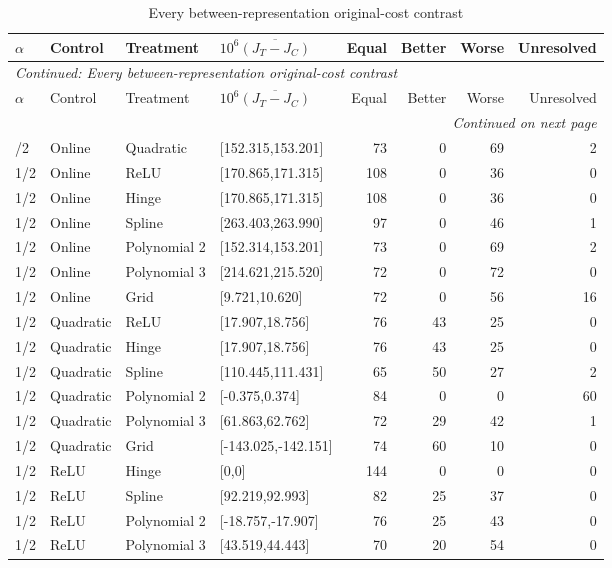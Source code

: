 \begingroup\footnotesize\setlength{\tabcolsep}{3pt}
\begin{longtable}{llllrrrr}
\caption{Every between-representation original-cost contrast}\label{tab:crossarm119c}\\
\toprule
$\alpha$ & Control & Treatment & $10^6\overline{(J_T-J_C)}$ & Equal & Better & Worse & Unresolved\\\midrule
\endfirsthead
\multicolumn{8}{l}{\textit{Continued: Every between-representation original-cost contrast}}\\
\toprule
$\alpha$ & Control & Treatment & $10^6\overline{(J_T-J_C)}$ & Equal & Better & Worse & Unresolved\\\midrule
\endhead
\midrule\multicolumn{8}{r}{\textit{Continued on next page}}\\
\endfoot
\bottomrule
\endlastfoot
1/2 & Online & Quadratic & [152.315,153.201] & 73 & 0 & 69 & 2 \\
1/2 & Online & ReLU & [170.865,171.315] & 108 & 0 & 36 & 0 \\
1/2 & Online & Hinge & [170.865,171.315] & 108 & 0 & 36 & 0 \\
1/2 & Online & Spline & [263.403,263.990] & 97 & 0 & 46 & 1 \\
1/2 & Online & Polynomial 2 & [152.314,153.201] & 73 & 0 & 69 & 2 \\
1/2 & Online & Polynomial 3 & [214.621,215.520] & 72 & 0 & 72 & 0 \\
1/2 & Online & Grid & [9.721,10.620] & 72 & 0 & 56 & 16 \\
1/2 & Quadratic & ReLU & [17.907,18.756] & 76 & 43 & 25 & 0 \\
1/2 & Quadratic & Hinge & [17.907,18.756] & 76 & 43 & 25 & 0 \\
1/2 & Quadratic & Spline & [110.445,111.431] & 65 & 50 & 27 & 2 \\
1/2 & Quadratic & Polynomial 2 & [-0.375,0.374] & 84 & 0 & 0 & 60 \\
1/2 & Quadratic & Polynomial 3 & [61.863,62.762] & 72 & 29 & 42 & 1 \\
1/2 & Quadratic & Grid & [-143.025,-142.151] & 74 & 60 & 10 & 0 \\
1/2 & ReLU & Hinge & [0,0] & 144 & 0 & 0 & 0 \\
1/2 & ReLU & Spline & [92.219,92.993] & 82 & 25 & 37 & 0 \\
1/2 & ReLU & Polynomial 2 & [-18.757,-17.907] & 76 & 25 & 43 & 0 \\
1/2 & ReLU & Polynomial 3 & [43.519,44.443] & 70 & 20 & 54 & 0 \\

\end{longtable}
